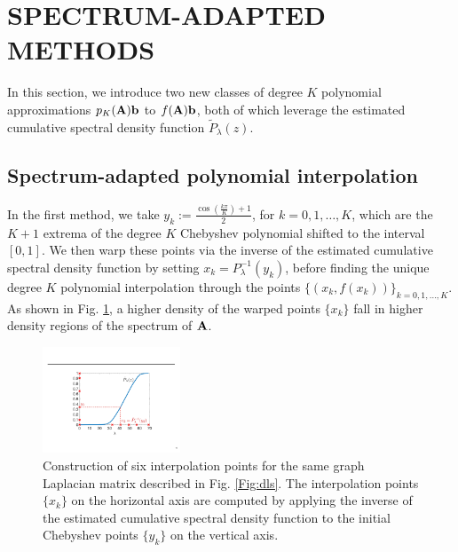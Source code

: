 \documentclass{article}
\begin{document}
\section{SPECTRUM-ADAPTED METHODS} \label{Se:spectrum_adapted}
In this section, we introduce two new classes of degree $K$ polynomial approximations $p_K({\bf A}){\bf b}$ to $f({\bf A}){\bf b}$, both of which leverage the estimated cumulative spectral density function $\tilde{P}_{\lambda}(z)$. 

\subsection{Spectrum-adapted polynomial interpolation} \label{Se:interpolation}
In the first method, we take $y_k:=\frac{\cos\left(\frac{k\pi}{K}\right)+1}{2}$, for $k=0, 1, \ldots, K$, which are the $K+1$ extrema of the degree $K$ Chebyshev polynomial shifted to the interval $[0,1]$. We then 
warp these points via the inverse of the estimated cumulative spectral density function by setting $x_k=P_{\lambda}^{-1}(y_k)$, %
before finding the unique degree $K$ polynomial interpolation through the points $\{(x_k, f(x_k))\}_{k=0,1,\ldots,K}$. As shown in Fig. \ref{Fig:inverse}, a higher density of the warped points $\{x_k\}$ fall in higher density regions of the spectrum of ${\bf A}$.
\begin{figure}[tbh]
\centerline{\includegraphics[width=4.1cm]{fig_inverse}}
\caption{Construction of six interpolation points for the same graph Laplacian matrix described in Fig. \ref{Fig:dls}. The interpolation points $\{x_k\}$ on the horizontal axis are computed by applying the inverse of the estimated cumulative spectral density function to the initial Chebyshev points $\{y_k\}$ on the vertical axis.}
\label{Fig:inverse}
\end{figure}
\vspace{-.1in}
\end{document}
